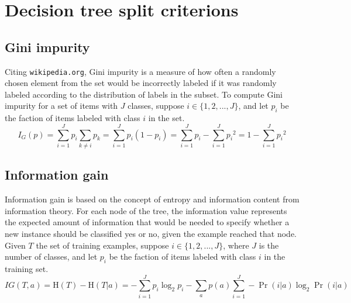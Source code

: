 \documentclass[11pt, a4paper]{article}
\begin{document}
\section{Decision tree split criterions}
  \label{appendix:splitcriterions}
  \subsection{Gini impurity}
    Citing \texttt{wikipedia.org}, Gini impurity is a measure of how often a randomly chosen element from the set would be incorrectly labeled if it was randomly labeled according to the distribution of labels in the subset. To compute Gini impurity for a set of items with $J$ classes, suppose $i\in\{1,2,...,J\}$, and let $p_{i}$ be the faction of items labeled with class $i$ in the set.
    \[{I} _{G}(p)=\sum _{i=1}^{J}p_{i}\sum _{k\neq i}p_{k}=\sum _{i=1}^{J}p_{i}(1-p_{i})=\sum _{i=1}^{J}p_{i}-\sum _{i=1}^{J}{p_{i}}^{2}=1-\sum _{i=1}^{J}{p_{i}}^{2}\]
  \subsection{Information gain}
    Information gain is based on the concept of entropy and information content from information theory. For each node of the tree, the information value represents the expected amount of information that would be needed to specify whether a new instance should be classified yes or no, given the example reached that node. Given $T$ the set of training examples, suppose $i\in\{1,2,...,J\}$, where $J$ is the number of classes, and let $p_{i}$ be the faction of items labeled with class $i$ in the training set.
    \[IG(T, a)=\mathrm{H}(T)-\mathrm{H}(T|a)=-\sum _{i=1}^{J}p_{i}\log _{2}{p_{i}}-\sum _{a}{p(a)\sum _{i=1}^{J}-\Pr(i|a)\log _{2}{\Pr(i|a)}}\]



\end{document}
